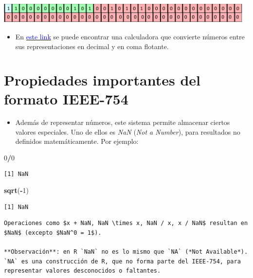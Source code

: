 \documentclass[openany]{book}
\newenvironment{Shaded}{\begin{snugshade}}{\end{snugshade}}
\newcommand{\DecValTok}[1]{\textcolor[rgb]{0.00,0.00,0.81}{#1}}
\newcommand{\KeywordTok}[1]{\textcolor[rgb]{0.13,0.29,0.53}{\textbf{#1}}}
\newcommand{\NormalTok}[1]{#1}
\newcommand{\OperatorTok}[1]{\textcolor[rgb]{0.81,0.36,0.00}{\textbf{#1}}}
\providecommand{\tightlist}{%
  \setlength{\itemsep}{0pt}\setlength{\parskip}{0pt}}
\begin{document}
\begin{center}\includegraphics[width=1\linewidth]{Plots/U1/floatej} \end{center}

\begin{itemize}
\tightlist
\item
  En \href{http://weitz.de/ieee/}{\textcolor{blue}{este link}} se puede encontrar una calculadora que convierte números entre sus representaciones en decimal y en coma flotante.
\end{itemize}

\hypertarget{propiedades-importantes-del-formato-ieee-754}{%
\section{Propiedades importantes del formato IEEE-754}\label{propiedades-importantes-del-formato-ieee-754}}

\begin{itemize}
\tightlist
\item
  Además de representar números, este sistema permite almacenar ciertos valores especiales. Uno de ellos es \emph{NaN} (\emph{Not a Number}), para resultados no definidos matemáticamente. Por ejemplo:
\end{itemize}

\begin{Shaded}
\begin{Highlighting}[]
\DecValTok{0}\OperatorTok{/}\DecValTok{0}
\end{Highlighting}
\end{Shaded}

\begin{verbatim}
[1] NaN
\end{verbatim}

\begin{Shaded}
\begin{Highlighting}[]
\KeywordTok{sqrt}\NormalTok{(}\OperatorTok{-}\DecValTok{1}\NormalTok{)}
\end{Highlighting}
\end{Shaded}

\begin{verbatim}
[1] NaN
\end{verbatim}

\begin{verbatim}
Operaciones como $x + NaN, NaN \times x, NaN / x, x / NaN$ resultan en $NaN$ (excepto $NaN^0 = 1$).

**Observación**: en R `NaN` no es lo mismo que `NA` (*Not Available*). `NA` es una construcción de R, que no forma parte del IEEE-754, para representar valores desconocidos o faltantes.
\end{verbatim}
\end{document}
